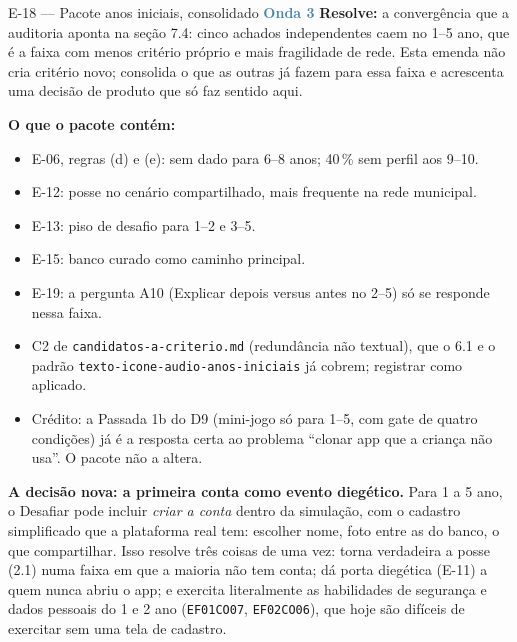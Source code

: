 \documentclass[11pt,a4paper]{article}
\newcommand{\onda}[1]{\textcolor{SteelBlue}{\textbf{Onda #1}}}
\begin{document}
\begin{emendabox}{E-18 --- Pacote anos iniciais, consolidado \hfill \onda{3}}
\textbf{Resolve:} a convergência que a auditoria aponta na seção 7.4: cinco achados independentes
caem no 1\textordmasculine{}--5\textordmasculine{} ano, que é a faixa com menos critério próprio e
mais fragilidade de rede. Esta emenda não cria critério novo; consolida o que as outras já fazem
para essa faixa e acrescenta uma decisão de produto que só faz sentido aqui.

\textbf{O que o pacote contém:}
\begin{itemize}
  \item E-06, regras (d) e (e): sem dado para 6--8 anos; 40\,\% sem perfil aos 9--10.
  \item E-12: posse no cenário compartilhado, mais frequente na rede municipal.
  \item E-13: piso de desafio para 1\textordmasculine{}--2\textordmasculine{} e
        3\textordmasculine{}--5\textordmasculine{}.
  \item E-15: banco curado como caminho principal.
  \item E-19: a pergunta A10 (Explicar depois versus antes no
        2\textordmasculine{}--5\textordmasculine{}) só se responde nessa faixa.
  \item C2 de \texttt{candidatos-a-criterio.md} (redundância não textual), que o 6.1 e o padrão
        \texttt{texto-icone-audio-anos-iniciais} já cobrem; registrar como aplicado.
  \item Crédito: a Passada 1b do D9 (mini-jogo só para 1\textordmasculine{}--5\textordmasculine{},
        com gate de quatro condições) já é a resposta certa ao problema ``clonar app que a criança
        não usa''. O pacote não a altera.
\end{itemize}

\textbf{A decisão nova: a primeira conta como evento diegético.} Para 1\textordmasculine{} a
5\textordmasculine{} ano, o Desafiar pode incluir \emph{criar a conta} dentro da simulação, com o
cadastro simplificado que a plataforma real tem: escolher nome, foto entre as do banco, o que
compartilhar. Isso resolve três coisas de uma vez: torna verdadeira a posse (2.1) numa faixa em que
a maioria não tem conta; dá porta diegética (E-11) a quem nunca abriu o app; e exercita
literalmente as habilidades de segurança e dados pessoais do 1\textordmasculine{} e
2\textordmasculine{} ano (\texttt{EF01CO07}, \texttt{EF02CO06}), que hoje são difíceis de
exercitar sem uma tela de cadastro.


\end{emendabox}
\end{document}

